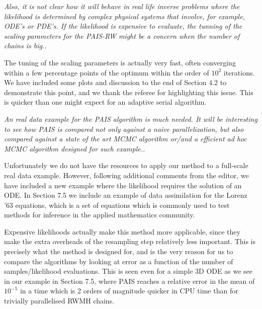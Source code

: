\documentclass{article}
\newcommand{\comment}[2]{\vspace{0.6cm}{\bf Comment:} {\it #1.}

\vspace{0.3cm}{\bf Answer:} #2}
\begin{document}
\comment{Also, it is not clear how it will behave in real life inverse 
problems where the likelihood is determined by complex physical systems that 
involve, for example, ODE's or PDE's. If the likelihood is expensive to 
evaluate, the tunning of the scaling parameters for the PAIS-RW might be a 
concern when the number of chains is big.}{The tuning of the scaling parameters is actually very fast, often converging within a few percentage points of the optimum within the order of $10^2$ iterations. We have included some plots and discussion to the end of Section 4.2 to demonstrate this point, and we thank the referee for highlighting this issue. This is quicker than one might expect for an adaptive serial algorithm.}%

\comment{An real data example for the PAIS algorithm is much needed. It will be 
interesting to see how PAIS is compared not only against a naive 
parallelization, but also compared against a state of the art MCMC algorithm 
or/and a efficient ad hoc MCMC algorithm designed for such example.}{Unfortunately we do not have the resources to apply our method to a full-scale real data example. However, following additional comments from the editor, we have included a new example where the likelihood requires the solution of an ODE. In Section 7.5 we include an example of data assimilation for the Lorenz '63 equations, which is a set of equations which is commonly used to test methods for inference in the applied mathematics community. 

Expensive likelihoods actually make this method more applicable, since they make the extra overheads of the resampling step relatively less important. This is precisely what the method is designed for, and is the very reason for us to compare the algorithms by looking at error as a function of the number of samples/likelihood evaluations. This is seen even for a simple 3D ODE as we see in our example in Section 7.5, where PAIS reaches a relative error in the mean of $10^{-5}$ in a time which is 2 orders of magnitude quicker in CPU time than for trivially parallelised RWMH chains.}%
\end{document}
